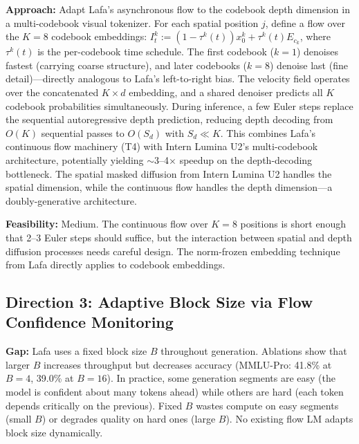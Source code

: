 \documentclass[11pt,a4paper]{article}
\begin{document}
\textbf{Approach:} Adapt Lafa's asynchronous flow to the codebook depth dimension in a multi-codebook visual tokenizer. For each spatial position $j$, define a flow over the $K{=}8$ codebook embeddings: $I_t^k := (1 - \tau^k(t)) x_0^k + \tau^k(t) E_{c_k}$, where $\tau^k(t)$ is the per-codebook time schedule. The first codebook ($k{=}1$) denoises fastest (carrying coarse structure), and later codebooks ($k{=}8$) denoise last (fine detail)---directly analogous to Lafa's left-to-right bias. The velocity field operates over the concatenated $K \times d$ embedding, and a shared denoiser predicts all $K$ codebook probabilities simultaneously. During inference, a few Euler steps replace the sequential autoregressive depth prediction, reducing depth decoding from $O(K)$ sequential passes to $O(S_d)$ with $S_d \ll K$. This combines Lafa's continuous flow machinery (T4) with Intern Lumina U2's multi-codebook architecture, potentially yielding $\sim$3--4$\times$ speedup on the depth-decoding bottleneck. The spatial masked diffusion from Intern Lumina U2 handles the spatial dimension, while the continuous flow handles the depth dimension---a doubly-generative architecture.

\textbf{Feasibility:} Medium. The continuous flow over $K{=}8$ positions is short enough that 2--3 Euler steps should suffice, but the interaction between spatial and depth diffusion processes needs careful design. The norm-frozen embedding technique from Lafa directly applies to codebook embeddings.

\subsection{Direction 3: Adaptive Block Size via Flow Confidence Monitoring}
\textbf{Gap:} Lafa uses a fixed block size $B$ throughout generation. Ablations show that larger $B$ increases throughput but decreases accuracy (MMLU-Pro: 41.8\% at $B{=}4$, 39.0\% at $B{=}16$). In practice, some generation segments are easy (the model is confident about many tokens ahead) while others are hard (each token depends critically on the previous). Fixed $B$ wastes compute on easy segments (small $B$) or degrades quality on hard ones (large $B$). No existing flow LM adapts block size dynamically.
\end{document}
